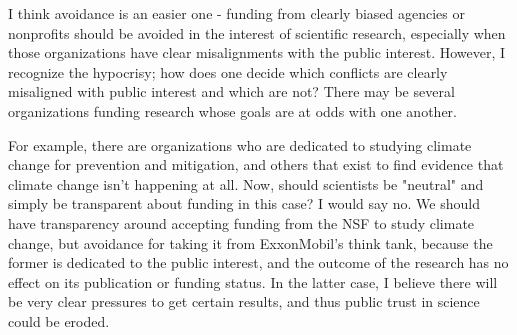 \documentclass[12pt]{article}
\begin{document}
\begin{enumerate}
I think avoidance is an easier one - funding from clearly biased agencies or nonprofits should
be avoided in the interest of scientific research, especially when those organizations have clear misalignments with the public interest. However, I recognize the hypocrisy; how does one decide which conflicts are clearly misaligned with public interest and which are not? There may be several organizations funding research whose goals are at odds with one another.

For example, there are organizations who are dedicated to studying climate change for prevention and mitigation, and others that exist to find evidence that climate change isn't happening at all. Now, should scientists be "neutral" and simply be transparent about funding in this case? I would say no. We should have transparency around accepting funding from the NSF to study climate change, but avoidance for taking it from ExxonMobil's think tank, because the former is dedicated to the public interest, and the outcome of the research has no effect on its publication or funding status. In the latter case, I believe there will be very clear pressures to get certain results, and thus public trust in science could be eroded.

\end{enumerate}
\end{document}
